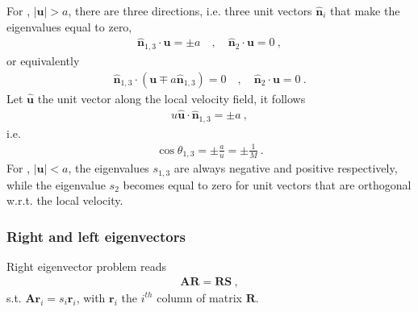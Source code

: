 \documentclass[letterpaper,10pt,english]{jupyterBook}
\begin{document}
\sphinxAtStartPar
{} For , \(|\mathbf{u}| > a\), there are three directions, i.e. three unit vectors \(\hat{\mathbf{n}}_i\) that make the eigenvalues equal to zero,
\begin{equation*}
\begin{split}\hat{\mathbf{n}}_{1,3} \cdot \mathbf{u} = \pm a \quad , \quad \hat{\mathbf{n}}_{2} \cdot \mathbf{u} = 0 \ ,\end{split}
\end{equation*}
\sphinxAtStartPar
or equivalently
\begin{equation*}
\begin{split}\hat{\mathbf{n}}_{1,3} \cdot \left( \mathbf{u} \mp a \hat{\mathbf{n}}_{1,3} \right) = 0 \quad , \quad \hat{\mathbf{n}}_2 \cdot \mathbf{u} = 0 \ .\end{split}
\end{equation*}
\sphinxAtStartPar
Let \(\hat{\mathbf{u}}\) the unit vector along the local velocity field, it follows
\begin{equation*}
\begin{split}u \hat{\mathbf{u}} \cdot \hat{\mathbf{n}}_{1,3} = \pm a \ ,\end{split}
\end{equation*}
\sphinxAtStartPar
i.e.
\begin{equation*}
\begin{split}\cos \theta_{1,3} = \pm \frac{a}{u} = \pm \frac{1}{M} \ .\end{split}
\end{equation*}
\sphinxAtStartPar
For , \(|\mathbf{u}| < a\), the eigenvalues \(s_{1,3}\) are always negative and positive respectively, while the eigenvalue \(s_2\) becomes equal to zero for unit vectors that are orthogonal w.r.t. the local velocity.
\subsubsection*{Right and left eigenvectors}

\sphinxAtStartPar
Right eigenvector problem reads
\begin{equation*}
\begin{split}\mathbf{A} \mathbf{R} = \mathbf{R} \mathbf{S} \ ,\end{split}
\end{equation*}
\sphinxAtStartPar
s.t. \(\mathbf{A} \mathbf{r}_i = s_i \mathbf{r}_i\), with \(\mathbf{r}_i\) the \(i^{th}\) column of matrix \(\mathbf{R}\).
\end{document}
